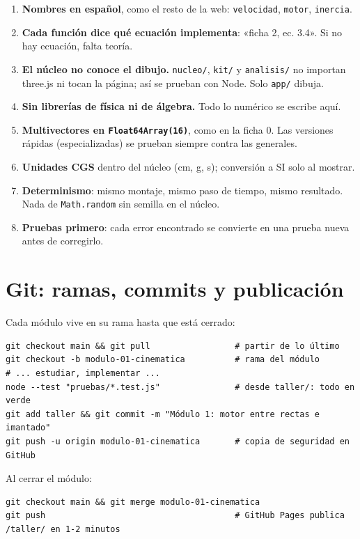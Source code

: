 \documentclass[11pt,a4paper]{article}
\begin{document}
\begin{enumerate}[leftmargin=*]
  \item \textbf{Nombres en español}, como el resto de la web: \texttt{velocidad}, \texttt{motor}, \texttt{inercia}.
  \item \textbf{Cada función dice qué ecuación implementa}: «ficha 2, ec. 3.4». Si no hay ecuación, falta teoría.
  \item \textbf{El núcleo no conoce el dibujo.} \texttt{nucleo/}, \texttt{kit/} y \texttt{analisis/} no importan
        three.js ni tocan la página; así se prueban con Node. Solo \texttt{app/} dibuja.
  \item \textbf{Sin librerías de física ni de álgebra.} Todo lo numérico se escribe aquí.
  \item \textbf{Multivectores en \texttt{Float64Array(16)}}, como en la ficha 0. Las versiones rápidas
        (especializadas) se prueban siempre contra las generales.
  \item \textbf{Unidades CGS} dentro del núcleo (cm, g, s); conversión a SI solo al mostrar.
  \item \textbf{Determinismo}: mismo montaje, mismo paso de tiempo, mismo resultado. Nada de \texttt{Math.random}
        sin semilla en el núcleo.
  \item \textbf{Pruebas primero}: cada error encontrado se convierte en una prueba nueva antes de corregirlo.
\end{enumerate}

\section{Git: ramas, commits y publicación}

Cada módulo vive en su rama hasta que está cerrado:
\begin{lstlisting}
git checkout main && git pull                 # partir de lo último
git checkout -b modulo-01-cinematica          # rama del módulo
# ... estudiar, implementar ...
node --test "pruebas/*.test.js"               # desde taller/: todo en verde
git add taller && git commit -m "Módulo 1: motor entre rectas e imantado"
git push -u origin modulo-01-cinematica       # copia de seguridad en GitHub
\end{lstlisting}

Al cerrar el módulo:
\begin{lstlisting}
git checkout main && git merge modulo-01-cinematica
git push                                      # GitHub Pages publica /taller/ en 1-2 minutos
\end{lstlisting}
\end{document}
